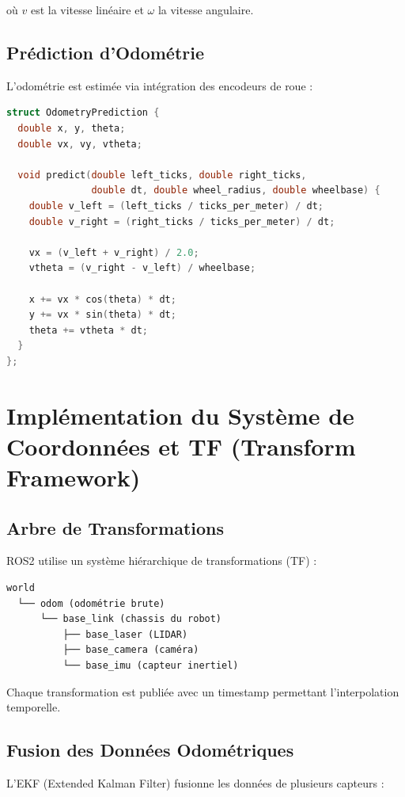 \documentclass[12pt,a4paper,oneside]{report}
\begin{document}
où $v$ est la vitesse linéaire et $\omega$ la vitesse angulaire.

\subsection{Prédiction d'Odométrie}

L'odométrie est estimée via intégration des encodeurs de roue :

\begin{lstlisting}[language=C++]
struct OdometryPrediction {
  double x, y, theta;
  double vx, vy, vtheta;
  
  void predict(double left_ticks, double right_ticks, 
               double dt, double wheel_radius, double wheelbase) {
    double v_left = (left_ticks / ticks_per_meter) / dt;
    double v_right = (right_ticks / ticks_per_meter) / dt;
    
    vx = (v_left + v_right) / 2.0;
    vtheta = (v_right - v_left) / wheelbase;
    
    x += vx * cos(theta) * dt;
    y += vx * sin(theta) * dt;
    theta += vtheta * dt;
  }
};
\end{lstlisting}

\section{Implémentation du Système de Coordonnées et TF (Transform Framework)}

\subsection{Arbre de Transformations}

ROS2 utilise un système hiérarchique de transformations (TF) :

\begin{verbatim}
world
  └── odom (odométrie brute)
      └── base_link (chassis du robot)
          ├── base_laser (LIDAR)
          ├── base_camera (caméra)
          └── base_imu (capteur inertiel)
\end{verbatim}

Chaque transformation est publiée avec un timestamp permettant l'interpolation temporelle.

\subsection{Fusion des Données Odométriques}

L'EKF (Extended Kalman Filter) fusionne les données de plusieurs capteurs :
\end{document}

